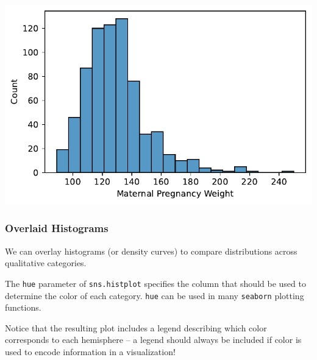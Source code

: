 \documentclass[
  letterpaper,
  DIV=11,
  numbers=noendperiod]{scrreprt}
\newenvironment{Shaded}{\begin{snugshade}}{\end{snugshade}}
\newcommand{\NormalTok}[1]{\textcolor[rgb]{0.00,0.23,0.31}{#1}}
\newcommand{\OperatorTok}[1]{\textcolor[rgb]{0.37,0.37,0.37}{#1}}
\newcommand{\StringTok}[1]{\textcolor[rgb]{0.13,0.47,0.30}{#1}}
\begin{document}
\begin{Shaded}
\end{Shaded}

\includegraphics{visualization_1/visualization_1_files/figure-pdf/cell-15-output-1.pdf}

\subsubsection{Overlaid Histograms}\label{overlaid-histograms}

We can overlay histograms (or density curves) to compare distributions
across qualitative categories.

The \texttt{hue} parameter of \texttt{sns.histplot} specifies the column
that should be used to determine the color of each category.
\texttt{hue} can be used in many \texttt{seaborn} plotting functions.

Notice that the resulting plot includes a legend describing which color
corresponds to each hemisphere -- a legend should always be included if
color is used to encode information in a visualization!
\end{document}
